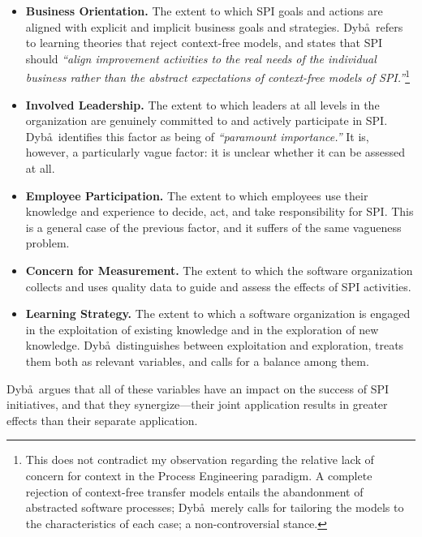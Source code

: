 \begin{itemize}
\item \textbf{Business Orientation.} The extent to which SPI goals and actions are aligned with explicit and implicit business goals and strategies. Dyb\aa~refers to learning theories that reject context-free models, and states that SPI should \emph{``align improvement activities to the real needs of the individual business rather than the abstract expectations of context-free models of SPI.''}\footnote{This does not contradict my observation regarding the relative lack of concern for context in the Process Engineering paradigm. A complete rejection of context-free transfer models entails the abandonment of abstracted software processes; Dyb\aa~merely calls for tailoring the models to the characteristics of each case; a non-controversial stance.}

\item \textbf{Involved Leadership.} The extent to which leaders at all levels in the organization are genuinely committed to and actively participate in SPI. Dyb\aa~identifies this factor as being of \emph{``paramount importance.''} It is, however, a particularly vague factor: it is unclear whether it can be assessed at all.

\item \textbf{Employee Participation.} The extent to which employees use their knowledge and experience to decide, act, and take responsibility for SPI. This is a general case of the previous factor, and it suffers of the same vagueness problem.

\item \textbf{Concern for Measurement.} The extent to which the software organization collects and uses quality data to guide and assess the effects of SPI activities.

\item \textbf{Learning Strategy.} The extent to which a software organization is engaged in the exploitation of existing knowledge and in the exploration of new knowledge. Dyb\aa~distinguishes between exploitation and exploration, treats them both as relevant variables, and calls for a balance among them.

\end{itemize}

Dyb\aa~argues that all of these variables have an impact on the success of SPI initiatives, and that they synergize---their joint application results in greater effects than their separate application.

